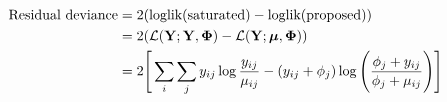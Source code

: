 \documentclass[12pt]{article}
\def\trans{^{\rm T}}
\newcommand{\bbL}{\mathcal{L}}
\newcommand{\bs}{\boldsymbol}
\newcommand{\cb}{\color{blue}}
\begin{document}
\begin{align*}
\M{Residual deviance} &= 2(\M{loglik(saturated)} - \M{loglik(proposed)}) \\
&=2(\bbL(\Y;\Y,\bPhi) - \bbL(\Y;\bs\mu,\bPhi) ) \\
&= 2\Bigg[ \sum_{i}\sum_{j} y_{ij}\log \frac{y_{ij}}{\mu_{ij}} - (y_{ij} + \phi_j)\log\Bigg( \frac{\phi_j + y_{ij}}{\phi_j + \mu_{ij}} \Bigg)\Bigg]
\end{align*}





%
%
\end{document}
